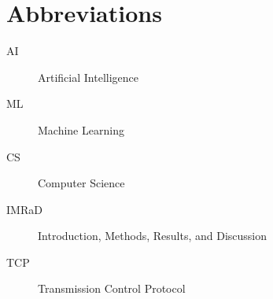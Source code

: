 \section*{Abbreviations}
\label{sec:abbreviations}
\begin{description}
    \item[AI] Artificial Intelligence
    \item[ML] Machine Learning
    \item[CS] Computer Science
    \item[IMRaD] Introduction, Methods, Results, and Discussion
    \item[TCP] Transmission Control Protocol
\end{description}